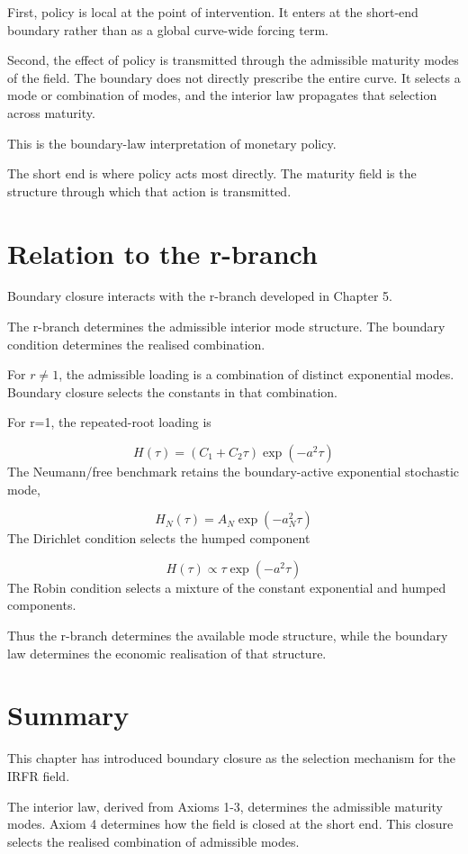 \documentclass[11pt,oneside]{book}
\begin{document}
First, policy is local at the point of intervention. It enters at the
short-end boundary rather than as a global curve-wide forcing term.

Second, the effect of policy is transmitted through the admissible
maturity modes of the field. The boundary does not directly prescribe
the entire curve. It selects a mode or combination of modes, and the
interior law propagates that selection across maturity.

This is the boundary-law interpretation of monetary policy.

The short end is where policy acts most directly. The maturity field is
the structure through which that action is transmitted.

\section{Relation to the r-branch}\label{relation-to-the-r-branch}

Boundary closure interacts with the r-branch developed in Chapter 5.

The r-branch determines the admissible interior mode structure. The
boundary condition determines the realised combination.

For $r\neq1$, the admissible loading is a combination of distinct exponential
modes. Boundary closure selects the constants in that combination.

For r=1, the repeated-root loading is

\[
H(\tau) = (C_1 + C_2\tau) \exp(-a^2\tau)
\]
The Neumann/free benchmark retains the boundary-active exponential
stochastic mode,

\[
H_N(\tau) = A_N \exp(-a_N^2\tau)
\]
The Dirichlet condition selects the humped component

\[
H(\tau) \propto \tau \exp(-a^2\tau)
\]
The Robin condition selects a mixture of the constant exponential and
humped components.

Thus the r-branch determines the available mode structure, while the
boundary law determines the economic realisation of that structure.

\section{Summary}\label{summary-2}

This chapter has introduced boundary closure as the selection mechanism
for the IRFR field.

The interior law, derived from Axioms 1-3, determines the admissible
maturity modes. Axiom 4 determines how the field is closed at the short
end. This closure selects the realised combination of admissible modes.
\end{document}
